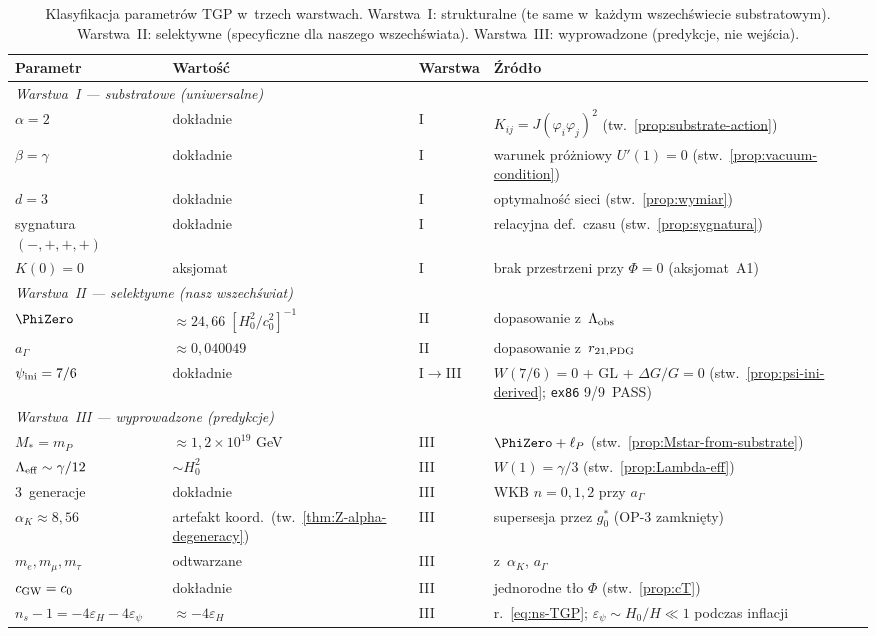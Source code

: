 \begin{table}[h!]
\centering\small
\caption{Klasyfikacja parametr\'ow TGP w~trzech warstwach.
Warstwa~I: stru\-ktu\-ral\-ne (te same w~ka\.zdym wszech\'swiecie
substratowym).
Warstwa~II: selektywne (specyficz\-ne dla naszego wszech\'swiata).
Warstwa~III: wy\-pro\-wa\-dzone (predykcje, nie wej\'scia).}
\label{tab:param-classification}
\begin{tabular}{@{}llll@{}}
\toprule
\textbf{Parametr} & \textbf{Warto\'s\'c} & \textbf{Warstwa} & \textbf{\'Zr\'od\l{}o} \\
\midrule
\multicolumn{4}{l}{\textit{Warstwa~I --- substratowe (uniwersalne)}} \\
$\alpha = 2$ & dok\l{}adnie & I & $K_{ij} = J(\varphi_i\varphi_j)^2$
  (tw.~\ref{prop:substrate-action}) \\
$\beta = \gamma$ & dok\l{}adnie & I & warunek pr\'o\.zniowy $U'(1)=0$
  (stw.~\ref{prop:vacuum-condition}) \\
$d = 3$ & dok\l{}adnie & I & optymalno\'s\'c sieci
  (stw.~\ref{prop:wymiar}) \\
sygnatura $(-,+,+,+)$ & dok\l{}adnie & I & relacyjna def.\ czasu
  (stw.~\ref{prop:sygnatura}) \\
$K(0) = 0$ & aksjomat & I & brak przestrzeni przy $\Phi = 0$
  (aksjomat~A1) \\
\midrule
\multicolumn{4}{l}{\textit{Warstwa~II --- selektywne (nasz wszech\'swiat)}} \\
$\PhiZero$ & $\approx 24{,}66\;[H_0^2/c_0^2]^{-1}$ & II &
  dopasowanie z~$\Lambda_{\rm obs}$ \\
$a_\Gamma$ & $\approx 0{,}040049$ & II &
  dopasowanie z~$r_{21,\rm PDG}$ \\
$\psi_{\rm ini} = 7/6$ & dok\l{}adnie & I$\to$III &
  $W(7/6)=0$ + GL + $\Delta G/G=0$
  (stw.~\ref{prop:psi-ini-derived}; \texttt{ex86} 9/9~PASS) \\
\midrule
\multicolumn{4}{l}{\textit{Warstwa~III --- wyprowadzone (predykcje)}} \\
$M_* = m_P$ & $\approx 1{,}2\times 10^{19}$ GeV & III &
  $\PhiZero + \ell_P$ (stw.~\ref{prop:Mstar-from-substrate}) \\
$\Lambda_{\rm eff} \sim \gamma/12$ & $\sim H_0^2$ & III &
  $W(1) = \gamma/3$ (stw.~\ref{prop:Lambda-eff}) \\
3~generacje & dok\l{}adnie & III &
  WKB $n=0,1,2$ przy $a_\Gamma$ \\
$\alpha_K \approx 8{,}56$ & artefakt koord.\ (tw.~\ref{thm:Z-alpha-degeneracy}) & III &
  supersesja przez $g_0^*$ (OP-3 zamkni\k{e}ty) \\
$m_e, m_\mu, m_\tau$ & odtwarzane & III &
  z~$\alpha_K$, $a_\Gamma$ \\
$c_{\rm GW} = c_0$ & dok\l{}adnie & III &
  jednorodne t\l{}o $\Phi$ (stw.~\ref{prop:cT}) \\
$n_s - 1 = -4\varepsilon_H - 4\varepsilon_\psi$ & $\approx -4\varepsilon_H$ & III &
  r.~\eqref{eq:ns-TGP}; $\varepsilon_\psi \sim H_0/H \ll 1$ podczas inflacji \\
\bottomrule
\end{tabular}
\end{table}

